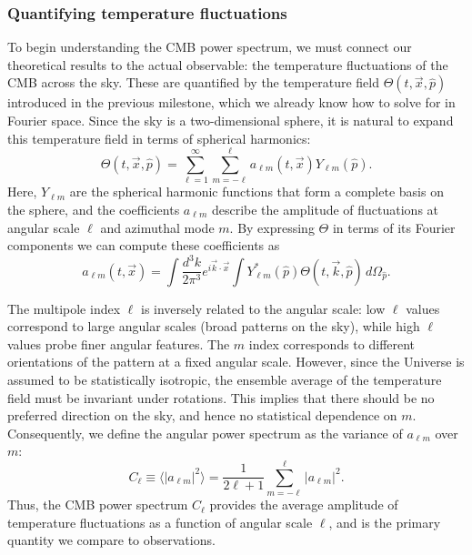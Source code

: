 \documentclass{aa}
\numberwithin{equation}{section}
\numberwithin{table}{section}
\numberwithin{figure}{section}
\begin{document}
\subsubsection{Quantifying temperature fluctuations}
To begin understanding the CMB power spectrum, we must connect our theoretical results to the actual observable: the temperature fluctuations of the CMB across the sky. These are quantified by the temperature field $\Theta(t,\vec{x},\hat{p})$ introduced in the previous milestone, which we already know how to solve for in Fourier space. 
Since the sky is a two-dimensional sphere, it is natural to expand this temperature field in terms of spherical harmonics:  
\begin{equation}
\Theta(t, \vec{x}, \hat{p}) = \sum_{\ell=1}^{\infty} \sum_{m=-\ell}^{\ell} a_{\ell m}(t, \vec{x}) Y_{\ell m}(\hat{p}).
\end{equation}
Here, $Y_{\ell m}$ are the spherical harmonic functions that form a complete basis on the sphere, and the coefficients $a_{\ell m}$ describe the amplitude of fluctuations at angular scale $\ell$ and azimuthal mode $m$. By expressing $\Theta$ in terms of its Fourier components we can compute these coefficients as
\begin{equation}
  a_{\ell m}(t,\vec{x}) = \int\frac{d^3k}{2\pi^3}e^{i\vec{k}\cdot\vec{x}}\int Y^*_{\ell m}(\hat{p})\Theta(t,\vec{k},\hat{p})\,d\Omega_{\hat{p}}. \label{eq: coeffs}
\end{equation}

The multipole index $\ell$ is inversely related to the angular scale: low $\ell$ values correspond to large angular scales (broad patterns on the sky), while high $\ell$ values probe finer angular features. The $m$ index corresponds to different orientations of the pattern at a fixed angular scale. However, since the Universe is assumed to be statistically isotropic, the ensemble average of the temperature field must be invariant under rotations. This implies that there should be no preferred direction on the sky, and hence no statistical dependence on $m$. Consequently, we define the angular power spectrum as the variance of $a_{\ell m}$ over $m$:  
\begin{equation}
C_\ell \equiv \langle |a_{\ell m}|^2 \rangle = \frac{1}{2\ell+1} \sum_{m=-\ell}^{\ell} |a_{\ell m}|^2.
\end{equation}
Thus, the CMB power spectrum $C_\ell$ provides the average amplitude of temperature fluctuations as a function of angular scale $\ell$, and is the primary quantity we compare to observations.
\end{document}
